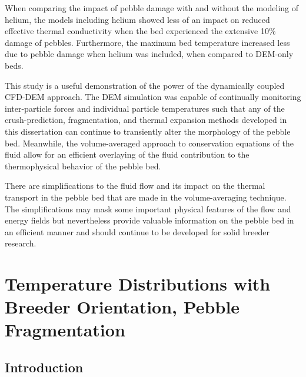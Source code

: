 When comparing the impact of pebble damage with and without the modeling of helium, the models including helium showed less of an impact on reduced effective thermal conductivity when the bed experienced the extensive 10\% damage of pebbles. Furthermore, the maximum bed temperature increased less due to pebble damage when helium was included, when compared to DEM-only beds.

This study is a useful demonstration of the power of the dynamically coupled CFD-DEM approach. The DEM simulation was capable of continually monitoring inter-particle forces and individual particle temperatures such that any of the crush-prediction, fragmentation, and thermal expansion methods developed in this dissertation can continue to transiently alter the morphology of the pebble bed. Meanwhile, the volume-averaged approach to conservation equations of the fluid allow for an efficient overlaying of the fluid contribution to the thermophysical behavior of the pebble bed.

There are simplifications to the fluid flow and its impact on the thermal transport in the pebble bed that are made in the volume-averaging technique. The simplifications may mask some important physical features of the flow and energy fields but nevertheless provide valuable information on the pebble bed in an efficient manner and should continue to be developed for solid breeder research.











\section{Temperature Distributions with Breeder Orientation, Pebble Fragmentation}\label{sec:isfnt-12}


\subsection{Introduction}

